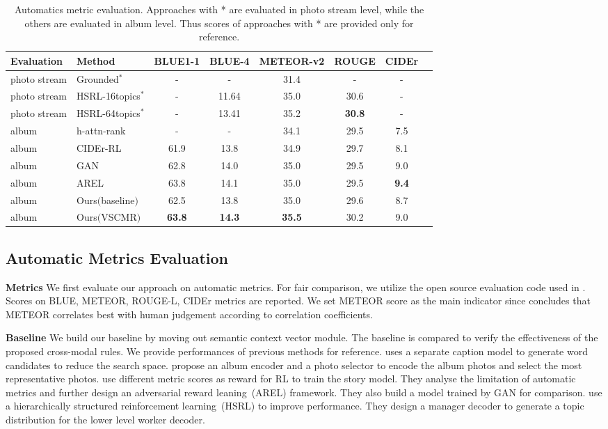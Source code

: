 \documentclass[sigconf]{acmart}
\begin{document}
\begin{table*}[t]
\centering
\caption{Automatics metric evaluation. Approaches with * are evaluated in photo stream level, while the others are evaluated in album level. Thus scores of approaches with * are provided only for reference.}
\begin{tabular}{llcccccc}
\toprule
Evaluation&Method&BLUE1-1&BLUE-4&METEOR-v2&ROUGE&CIDEr\\
\midrule
photo stream&Grounded$^*$\cite{huang2016visual}&-&-&31.4&-&-\\
photo stream&HSRL-16topics$^*$\cite{Huang18}&-&11.64&35.0&30.6&-\\
photo stream&HSRL-64topics$^*$\cite{Huang18}&-&13.41&35.2&\textbf{30.8}&-\\
album&h-attn-rank\cite{yu2017hierarchically}&-&-&34.1&29.5&7.5\\
album&CIDEr-RL\cite{wang2018no}&61.9&13.8&34.9&29.7&8.1\\
album&GAN\cite{wang2018no}&62.8&14.0&35.0&29.5&9.0\\
album&AREL\cite{wang2018no}&63.8&14.1&35.0&29.5&\textbf{9.4}\\
\midrule
album&Ours$($baseline$)$&62.5&13.8&35.0&29.6&8.7\\
album&Ours$($VSCMR$)$&\textbf{63.8}&\textbf{14.3}&\textbf{35.5}&30.2&9.0\\
\bottomrule
\end{tabular}
\setlength{\belowcaptionskip}{10pt}
\label{table2}
\end{table*}

\subsection{Automatic Metrics Evaluation}
\textbf{Metrics} We first evaluate our approach on automatic metrics. For fair comparison, we utilize the open source evaluation code used in \cite{yu2017hierarchically} \cite{wang2018no}. Scores on BLUE\cite{Papineni02}, METEOR\cite{SATANJEEV05}, ROUGE-L\cite{Lin04}, CIDEr\cite{vedantam2015cider} metrics are reported. We set METEOR score as the main indicator since \cite{huang2016visual} concludes that METEOR correlates best with human judgement according to correlation coefficients.

\textbf{Baseline} We build our baseline by moving out semantic context vector module. The baseline is compared to verify the effectiveness of the proposed cross-modal rules. We provide performances of previous methods for reference. \cite{huang2016visual} uses a separate caption model to generate word candidates to reduce the search space. \cite{yu2017hierarchically} propose an album encoder and a photo selector to encode the album photos and select the most representative photos. \cite{wang2018no} use different metric scores as reward for RL to train the story model. They analyse the limitation of automatic metrics and further design an adversarial reward leaning~(AREL) framework. They also build a model trained by GAN for comparison. \cite{Huang18} use a hierarchically structured reinforcement learning~(HSRL) to improve performance. They design a manager decoder to generate a topic distribution for the lower level worker decoder. 
\end{document}
